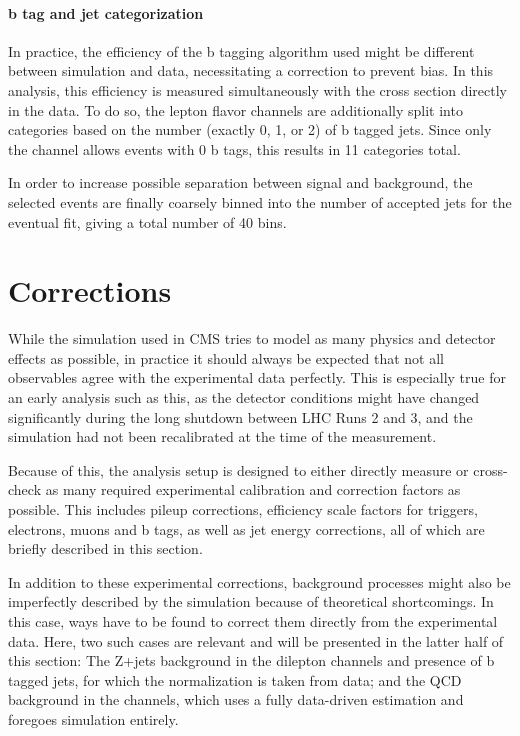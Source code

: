 \paragraph{b tag and jet categorization}

In practice, the efficiency of the b tagging algorithm used might be different between simulation and data, necessitating a correction to prevent bias. In this analysis, this efficiency is measured simultaneously with the cross section directly in the data. To do so, the lepton flavor channels are additionally split into categories based on the number (exactly 0, 1, or 2) of b tagged jets. Since only the \emu channel allows events with 0 b tags, this results in 11 categories total.

In order to increase possible separation between \ttbar signal and background, the selected events are finally coarsely binned into the number of accepted jets for the eventual fit, giving a total number of 40 bins.

\section{Corrections}
\label{sec:ttxs:corrections}

While the simulation used in CMS tries to model as many physics and detector effects as possible, in practice it should always be expected that not all observables agree with the experimental data perfectly. This is especially true for an early analysis such as this, as the detector conditions might have changed significantly during the long shutdown between LHC Runs 2 and 3, and the simulation had not been recalibrated at the time of the measurement. 

Because of this, the analysis setup is designed to either directly measure or cross-check as many required experimental calibration and correction factors as possible. This includes pileup corrections, efficiency scale factors for triggers, electrons, muons and b tags, as well as jet energy corrections, all of which are briefly described in this section.

In addition to these experimental corrections, background processes might also be imperfectly described by the simulation because of theoretical shortcomings. In this case, ways have to be found to correct them directly from the experimental data. Here, two such cases are relevant and will be presented in the latter half of this section: The Z+jets background in the dilepton channels and presence of b tagged jets, for which the normalization is taken from data; and the QCD background in the \ljets channels, which uses a fully data-driven estimation and foregoes simulation entirely.

